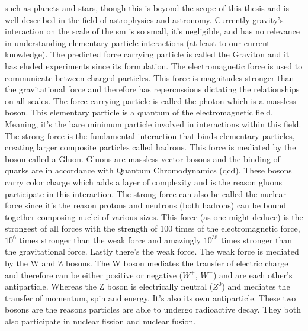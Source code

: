 such as planets and stars, though this is beyond the scope of this thesis and is well described in the field 
of astrophysics and astronomy. Currently gravity's interaction on the scale of the \gls{sm} is so 
small, it's negligible, and has no relevance in understanding elementary particle interactions (at least to 
our current knowledge). The predicted force carrying particle is called the Graviton and it has eluded 
experiments since its formulation.
The electromagnetic force is used to communicate between charged particles.
This force is magnitudes stronger than the gravitational force and therefore has repercussions dictating
the relationships on all scales. The force carrying particle is called the photon which is a massless boson. This elementary particle is a quantum of the electromagnetic field. 
Meaning, it's the bare minimum particle involved in interactions within this field. 
The strong force is the fundamental interaction that binds elementary particles, creating larger composite particles 
called hadrons. This force is mediated by the boson called a Gluon. Gluons are massless vector bosons and the binding of 
quarks are in accordance with Quantum Chromodynamics (\gls{qcd}). These bosons carry color charge which adds a layer of complexity
and is the reason gluons participate in this interaction. The strong force can also be called the nuclear force since 
it's the reason protons and neutrons (both hadrons) can be bound together composing nuclei of various sizes. This force 
(as one might deduce) is the strongest of all forces with the strength of 100 times of the electromagnetic force, \(10^6\) 
times stronger than the weak force and amazingly \(10^{38}\) times stronger than the gravitational force.
Lastly there's the weak force. The weak force is mediated by the W and Z bosons. The W boson mediates the transfer of 
electric charge and therefore can be either positive or negative (\(W^+\), \(W^-\)) and are each other's antiparticle.
Whereas the Z boson is electrically neutral (\(Z^0\)) and mediates the transfer of momentum, spin and energy. It's also 
its own antiparticle. These two bosons are the reasons particles are able to undergo radioactive decay. They both also 
participate in nuclear fission and nuclear fusion. 



